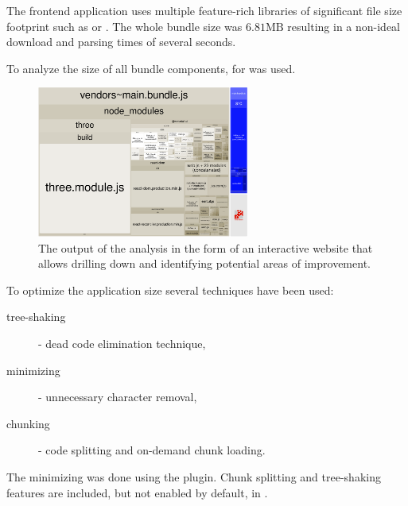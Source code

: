 The frontend application uses multiple feature-rich libraries of significant file size footprint such as  or . The whole bundle size was $ 6.81\mathrm{MB} $ resulting in a non-ideal download and parsing times of several seconds.

\medskip
To analyze the size of all bundle components,  for  was used. 

\medskip

\begin{figure}[H]
	\caption{The output of the analysis in the form of an interactive website that allows drilling down and identifying potential areas of improvement.}
  \centering
    \includegraphics[width=0.62\textwidth]{assets/3-bundle.png}
\end{figure}

To optimize the application size several techniques have been used:

\begin{description}
	\item[tree-shaking] - dead code elimination technique,
	\item[minimizing] - unnecessary character removal,
	\item[chunking] - code splitting and on-demand chunk loading.
\end{description}

The minimizing was done using the  plugin. Chunk splitting and tree-shaking features are included, but not enabled by default, in .

